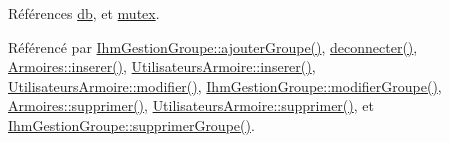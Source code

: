 Références \hyperlink{class_base_de_donnees_a3e738dcf443370c46a541677ab619f06}{db}, et \hyperlink{class_base_de_donnees_aa1b4696fac87a740f914aa73739086f2}{mutex}.



Référencé par \hyperlink{class_ihm_gestion_groupe_a5e5b11cb395970f64b30427ccb2ecf4d}{Ihm\+Gestion\+Groupe\+::ajouter\+Groupe()}, \hyperlink{class_base_de_donnees_ae780999d25a26a0e4dbe0706a4785978}{deconnecter()}, \hyperlink{class_armoires_a0aa944d8f94667783ea95424e1915aba}{Armoires\+::inserer()}, \hyperlink{class_utilisateurs_armoire_a773bfde7c49dac8fa2c8a1c9a43592c0}{Utilisateurs\+Armoire\+::inserer()}, \hyperlink{class_utilisateurs_armoire_affd91d7591d57b8dafc098f09b9319aa}{Utilisateurs\+Armoire\+::modifier()}, \hyperlink{class_ihm_gestion_groupe_a810c186bf38dab776c7167c85671b268}{Ihm\+Gestion\+Groupe\+::modifier\+Groupe()}, \hyperlink{class_armoires_aa8cb545cec5ebf4603dff93e87662cc9}{Armoires\+::supprimer()}, \hyperlink{class_utilisateurs_armoire_a035d7ca496ddaaf83467934fbd694883}{Utilisateurs\+Armoire\+::supprimer()}, et \hyperlink{class_ihm_gestion_groupe_a08bdd132a37ac574b15d00e4dc959d7f}{Ihm\+Gestion\+Groupe\+::supprimer\+Groupe()}.


